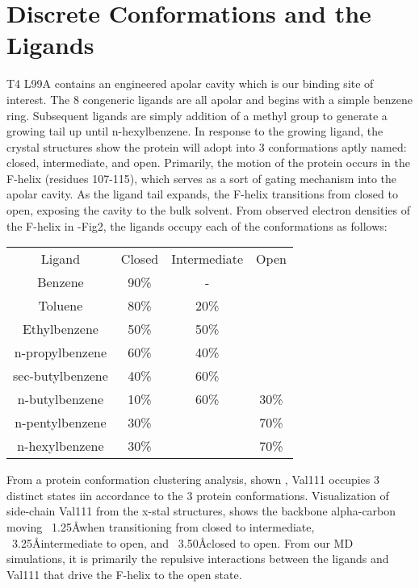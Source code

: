 \documentclass{article}
\begin{document}
\section{Discrete Conformations and the Ligands}
T4 L99A contains an engineered apolar cavity which is our binding site of interest.
The 8 congeneric ligands are all apolar and begins with a simple benzene ring. 
Subsequent ligands are simply addition of a methyl group to generate a growing tail up until n-hexylbenzene.
In response to the growing ligand, the crystal structures show the protein will adopt into 3 conformations aptly named: closed, intermediate, and open.
Primarily, the motion of the protein occurs in the F-helix (residues 107-115), which serves as a sort of gating mechanism into the apolar cavity.
As the ligand tail expands, the F-helix transitions from closed to open, exposing the cavity to the bulk solvent.
From observed electron densities of the F-helix in \cite{Merski2015}-Fig2, the ligands occupy each of the conformations as follows:

\begin{tabular}{|c|c|c|c|}
\hline
Ligand           & Closed & Intermediate & Open  \\
Benzene          & 90\%   & -            &       \\
Toluene          & 80\%   & 20\%         &       \\
Ethylbenzene     & 50\%   & 50\%         &       \\
n-propylbenzene  & 60\%   & 40\%         &       \\
sec-butylbenzene & 40\%   & 60\%         &       \\
n-butylbenzene   & 10\%   & 60\%         & 30\%  \\
n-pentylbenzene  & 30\%   &              & 70\%  \\
n-hexylbenzene   & 30\%   &              & 70\%  \\
\hline
\end{tabular}

From a protein conformation clustering analysis, shown \cite{Merski2015}, Val111 occupies 3 distinct states iin accordance to the 3 protein conformations.
Visualization of side-chain Val111 from the x-stal structures, shows the backbone alpha-carbon moving ~1.25\AA when transitioning from closed to intermediate, ~3.25\AA intermediate to open, and ~3.50\AA closed to open.
From our MD simulations, it is primarily the repulsive interactions between the ligands and Val111 that drive the F-helix to the open state.
\end{document}
